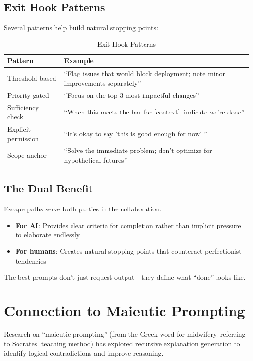 \subsection{Exit Hook Patterns}

Several patterns help build natural stopping points:

\begin{table}[H]
\centering
\begin{tabularx}{\textwidth}{lX}
\toprule
\textbf{Pattern} & \textbf{Example} \\
\midrule
Threshold-based & ``Flag issues that would block deployment; note minor improvements separately'' \\
Priority-gated & ``Focus on the top 3 most impactful changes'' \\
Sufficiency check & ``When this meets the bar for [context], indicate we're done'' \\
Explicit permission & ``It's okay to say 'this is good enough for now' '' \\
Scope anchor & ``Solve the immediate problem; don't optimize for hypothetical futures'' \\
\bottomrule
\end{tabularx}
\caption{Exit Hook Patterns}
\end{table}

\subsection{The Dual Benefit}

Escape paths serve both parties in the collaboration:

\begin{itemize}
    \item \textbf{For AI}: Provides clear criteria for completion rather than implicit pressure to elaborate endlessly
    \item \textbf{For humans}: Creates natural stopping points that counteract perfectionist tendencies
\end{itemize}

The best prompts don't just request output---they define what ``done'' looks like.

\section{Connection to Maieutic Prompting}

Research on ``maieutic prompting'' (from the Greek word for midwifery, referring to Socrates' teaching method) has explored recursive explanation generation to identify logical contradictions and improve reasoning.

